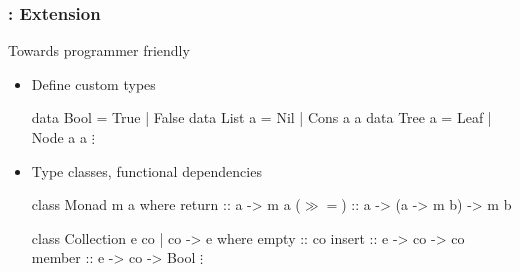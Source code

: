 \begin{frame}[c, fragile]
  \frametitle{\qub{}: Extension}
  \begin{center}
   {\large Towards programmer friendly}
   \begin{itemize}
   \item<1-> Define custom types

   \begin{haskell}
                  data Bool   = True | False
                  data List a = Nil  | Cons a a
                  data Tree a = Leaf | Node a a
                               $\vdots$
   \end{haskell}
   \item<2-> Type classes, functional dependencies
    \begin{haskell}
                 class Monad m a  where
                      return      :: a -> m a
                      ($\gg\!=$)  :: a -> (a -> m b) -> m b

                 class Collection e co | co -> e where
                      empty :: co
                      insert :: e -> co -> co
                      member :: e -> co -> Bool
                              $\vdots$
   \end{haskell}
 \end{itemize}

 \end{center}
\end{frame}


